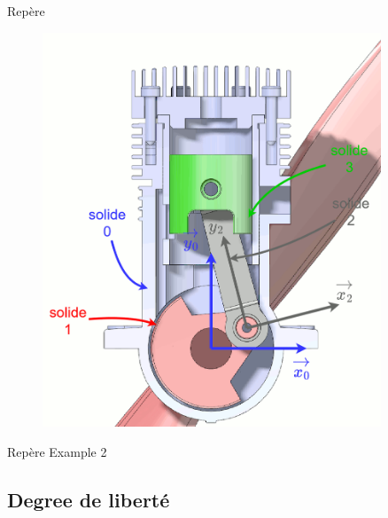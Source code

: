 \documentclass[
  ignorenonframetext,
  aspectratio=169,
  c]{beamer}
\begin{document}
\begin{frame}{Repère}
\begin{figure}
\begin{minipage}{0.50\linewidth}
\begin{center}
\includegraphics[width=0.9\textwidth,height=\textheight]{CM3/Repere-02.gif}
\end{center}
\end{minipage}%

\end{figure}%
\end{frame}

\begin{frame}{Repère}
\label{repuxe8re-2}
Example 2
\end{frame}

\subsection{Degree de liberté}\label{degree-de-libertuxe9}
\end{document}
